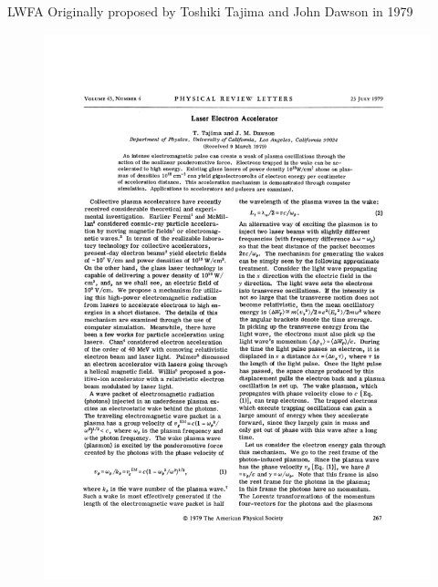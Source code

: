 \documentclass[]{beamer}
\begin{document}
  \begin{frame}{LWFA}
  Originally proposed by Toshiki Tajima and John Dawson in 1979
  \begin{figure}
    \includegraphics[height=0.7\textheight]{figures/PhysRevLett.43.267.pdf}
  \end{figure}
  \end{frame}
      
\end{document}
